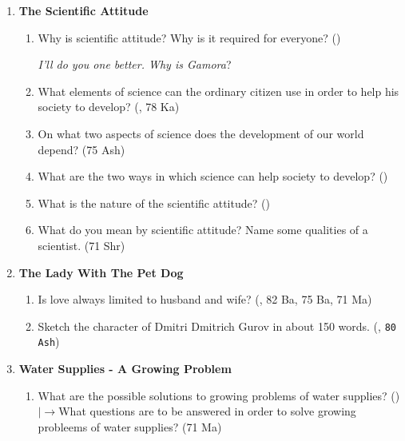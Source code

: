 \documentclass[12pt]{article}
\newcommand{\lb}{\\$\left|\rightarrow\right.$}
\begin{document}
\begin{enumerate}
      \item \textbf{The Scientific Attitude}\\
      \begin{enumerate}
        \item Why is scientific attitude? Why is it required for everyone? \hfill ()\\
          \begin{tiny}\textit{I'll do you one better. Why is Gamora}? \end{tiny}

        \item What elements of science can the ordinary citizen use in order to help his society to develop? \hfill (, 78 Ka)

        \item On what two aspects of science does the development of our world depend? \hfill (75 Ash)

        \item What are the two ways in which science can help society to develop? \hfill ()

        \item What is the nature of the scientific attitude? \hfill ()

        \item What do you mean by scientific attitude? Name some qualities of a scientist. \hfill (71 Shr)
      \end{enumerate}

      \item \textbf{The Lady With The Pet Dog}
       \begin{enumerate}
         \item Is love always limited to husband and wife? \hfill (, 82 Ba, 75 Ba, 71 Ma)

        \item Sketch the character of Dmitri Dmitrich Gurov in about 150 words. \hfill (, \texttt{80 Ash})
      \end{enumerate}

      \item \textbf{Water Supplies - A Growing Problem}
      \begin{enumerate}
        \item What are the possible solutions to growing problems of water supplies? \hfill ()
          \lb What questions are to be answered in order to solve growing probleems of water supplies? \hfill (71 Ma)
      \end{enumerate}


\end{enumerate}
\end{document}
